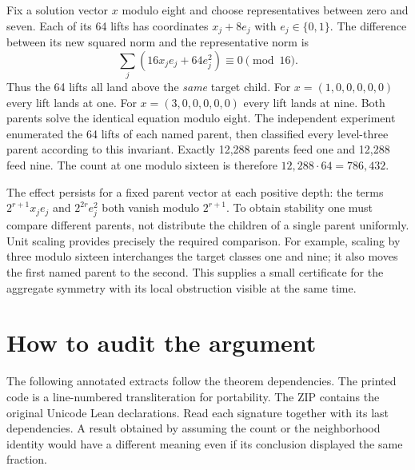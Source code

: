 \documentclass[12pt,letterpaper]{article}
\begin{document}
Fix a solution vector $x$ modulo eight and choose representatives between zero and seven. Each of its 64 lifts has coordinates $x_j+8e_j$ with $e_j\in\{0,1\}$. The difference between its new squared norm and the representative norm is
\[
  \sum_j(16x_je_j+64e_j^2)\equiv0\pmod {16}.
\]
Thus the 64 lifts all land above the \emph{same} target child. For $x=(1,0,0,0,0,0)$ every lift lands at one. For $x=(3,0,0,0,0,0)$ every lift lands at nine. Both parents solve the identical equation modulo eight. The independent experiment enumerated the 64 lifts of each named parent, then classified every level-three parent according to this invariant. Exactly 12,288 parents feed one and 12,288 feed nine. The count at one modulo sixteen is therefore $12,288\cdot64=786,432$.

The effect persists for a fixed parent vector at each positive depth: the terms $2^{r+1}x_je_j$ and $2^{2r}e_j^2$ both vanish modulo $2^{r+1}$. To obtain stability one must compare different parents, not distribute the children of a single parent uniformly. Unit scaling provides precisely the required comparison. For example, scaling by three modulo sixteen interchanges the target classes one and nine; it also moves the first named parent to the second. This supplies a small certificate for the aggregate symmetry with its local obstruction visible at the same time.

\section{How to audit the argument}
The following annotated extracts follow the theorem dependencies. The printed code is a line-numbered transliteration for portability. The ZIP contains the original Unicode Lean declarations. Read each signature together with its last dependencies. A result obtained by assuming the count or the neighborhood identity would have a different meaning even if its conclusion displayed the same fraction.
\end{document}
